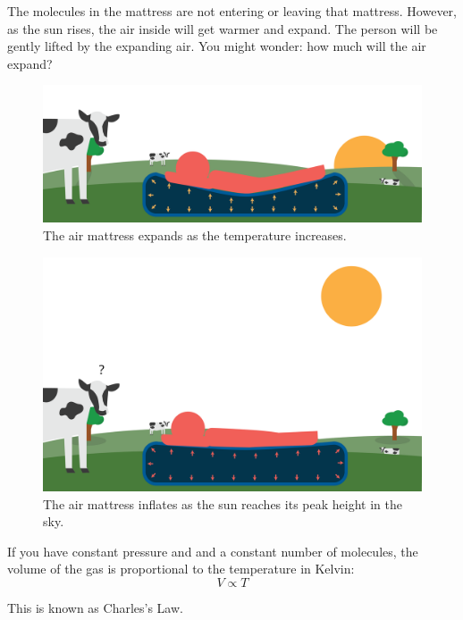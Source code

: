 The molecules in the mattress are not entering or leaving that mattress. However, as the sun rises, the air inside will get warmer and expand. The person will be gently lifted by the expanding air. You might wonder: how much will the air expand?
\begin{figure}[htbp]
    \centering
    \includegraphics[width=\textwidth]{airMattress2.png}
    \caption{The air mattress expands as the temperature increases.}
    \label{fig:airMattress2}
\end{figure}
\begin{figure}[htbp]
    \centering
    \includegraphics[width=\textwidth]{airMattress3.png}
    \caption{The air mattress inflates as the sun reaches its peak height in the sky.}
    \label{fig:airMattress3}
\end{figure}

If you have constant pressure and and a constant number of molecules, the volume of the gas is proportional to the temperature in Kelvin:
$$V \propto T$$

This is known as Charles's Law.

